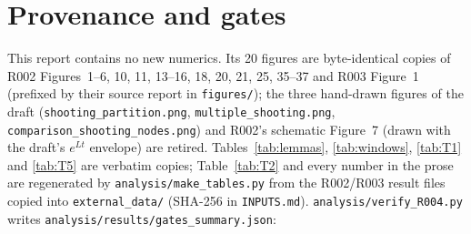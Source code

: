 \documentclass[11pt]{article}
\theoremstyle{remark}\newtheorem{remark}{Remark}
\begin{document}
\section{Provenance and gates}\label{sec:prov}
This report contains no new numerics. Its 20 figures are byte-identical copies of R002 Figures~1--6, 10, 11, 13--16, 18, 20, 21, 25, 35--37 and R003 Figure~1 (prefixed by their source report in \texttt{figures/}); the three hand-drawn figures of the draft (\texttt{shooting\_partition.png}, \texttt{multiple\_shooting.png}, \texttt{comparison\_shooting\_nodes.png}) and R002's schematic Figure~7 (drawn with the draft's $e^{Lt}$ envelope) are retired. Tables~\ref{tab:lemmas}, \ref{tab:windows}, \ref{tab:T1} and \ref{tab:T5} are verbatim copies; Table~\ref{tab:T2} and every number in the prose are regenerated by \texttt{analysis/make\_tables.py} from the R002/R003 result files copied into \texttt{external\_data/} (SHA-256 in \texttt{INPUTS.md}). \texttt{analysis/verify\_R004.py} writes \texttt{analysis/results/gates\_summary.json}:
\end{document}
